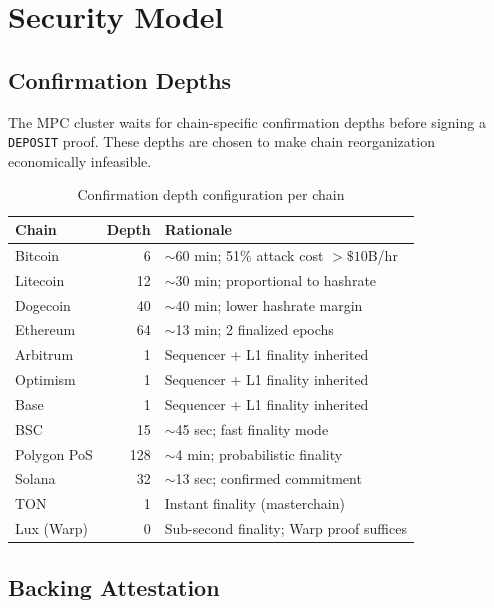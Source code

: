 \section{Security Model}

\label{sec:security}

\subsection{Confirmation Depths}
\label{sec:depths}

The MPC cluster waits for chain-specific confirmation depths before signing a \texttt{DEPOSIT} proof. These depths are chosen to make chain reorganization economically infeasible.

\begin{table}[H]
\centering
\begin{tabular}{lrl}
\toprule
\textbf{Chain} & \textbf{Depth} & \textbf{Rationale} \\
\midrule
Bitcoin        & 6    & $\sim$60 min; 51\% attack cost $>\$10$B/hr \\
Litecoin       & 12   & $\sim$30 min; proportional to hashrate \\
Dogecoin       & 40   & $\sim$40 min; lower hashrate margin \\
Ethereum       & 64   & $\sim$13 min; 2 finalized epochs \\
Arbitrum       & 1    & Sequencer + L1 finality inherited \\
Optimism       & 1    & Sequencer + L1 finality inherited \\
Base           & 1    & Sequencer + L1 finality inherited \\
BSC            & 15   & $\sim$45 sec; fast finality mode \\
Polygon PoS    & 128  & $\sim$4 min; probabilistic finality \\
Solana         & 32   & $\sim$13 sec; confirmed commitment \\
TON            & 1    & Instant finality (masterchain) \\
Lux (Warp)     & 0    & Sub-second finality; Warp proof suffices \\
\bottomrule
\end{tabular}
\caption{Confirmation depth configuration per chain}
\label{tab:depths}
\end{table}

\subsection{Backing Attestation}


